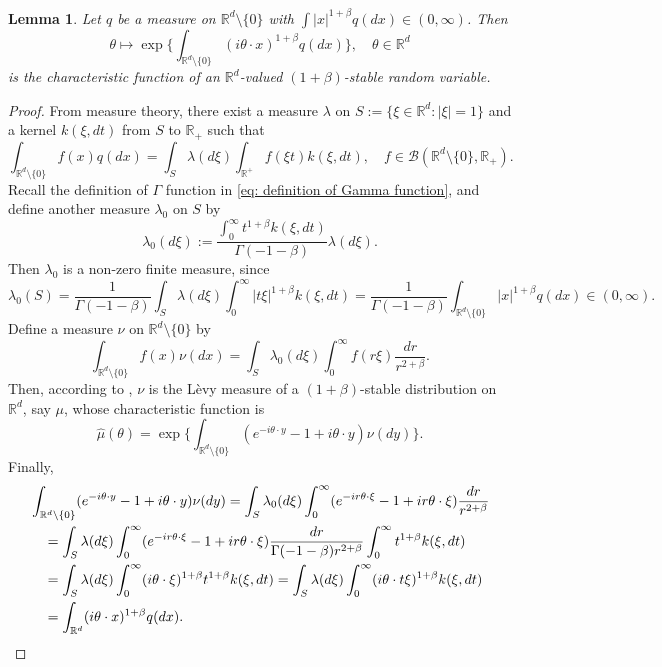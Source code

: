 \documentclass[12pt,a4paper]{amsart}
\theoremstyle{plain}
\newtheorem{lem}[thm]{Lemma}
\theoremstyle{definition}
\numberwithin{equation}{section}
\begin{document}
\begin{lem}
\label{lem: charactreisticfunction}
    Let $q$ be a measure on $\mathbb R^d\setminus\{0\}$ with $\int |x|^{1+\beta} q(dx) \in (0,\infty)$.
    Then $$\theta \mapsto  \exp\Big\{\int_{\mathbb R^d\setminus\{0\}} (i\theta \cdot x)^{1+\beta} q(dx)\Big\},\quad \theta \in \mathbb R^d$$
    is the characteristic function of an $\mathbb R^d$-valued $(1+\beta)$-stable random variable.
\end{lem}
\begin{proof}
    From measure theory, there exist a measure $\lambda$ on $S:= \{\xi\in \mathbb R^d:|\xi| = 1\}$ and a kernel $k(\xi,dt)$ from $S$ to $\mathbb R_+$ such that
\[
    \int_{\mathbb R^d\setminus \{0\}} f(x)q(dx) = \int_S \lambda(d\xi) \int_{\mathbb R^+} f(\xi t)k(\xi,dt),\quad
    f\in \mathcal B(\mathbb R^d\setminus \{0\}, \mathbb R_+).
\]
Recall the definition of $\Gamma$ function in \eqref{eq: definition of Gamma function}, and define another measure $\lambda_0$ on $S$ by
\[
    \lambda_0(d\xi) := \frac{\int_0^\infty t^{1+\beta}k(\xi,dt)}{\Gamma(-1-\beta)} \lambda (d\xi).
\]
    Then $\lambda_0$ is a non-zero finite measure, since
\[
    \lambda_0(S) = \frac{1}{\Gamma(-1-\beta)} \int_S \lambda (d\xi) \int_0^\infty |t\xi|^{1+\beta}k(\xi,dt)
    = \frac{1}{\Gamma(-1-\beta)} \int_{\mathbb R^d\setminus\{0\}} |x|^{1+\beta} q(dx) \in (0,\infty).
\]
    Define a measure $\nu$ on $\mathbb R^d\setminus\{0\}$ by
\[
    \int_{\mathbb R^d\setminus\{0\}}f(x)\nu(dx)= \int_{S} \lambda_0(d\xi) \int_0^\infty f(r\xi) \frac{dr}{r^{2+\beta}} .
\]
    Then, according to \cite[Remark 14.4]{Sato1999Levy}, $\nu$ is the L\`evy measure of a $(1+\beta)$-stable distribution on $\mathbb R^d$, say $\mu$, whose characteristic function is \[\hat \mu(\theta)=\exp\Big\{\int_{\mathbb R^d\setminus\{0\}} (e^{-i\theta \cdot y}-1+i\theta \cdot y) \nu(dy)\Big\}.\]
	Finally,
\begin{equation}\begin{split}
    &\int_{\mathbb R^d\setminus\{0\}} (e^{-i\theta \cdot y}-1+i\theta \cdot y) \nu(dy)
    = \int_S \lambda_0(d\xi) \int_0^\infty (e^{-ir\theta \cdot \xi}-1+ir\theta \cdot \xi) \frac{dr}{r^{2+\beta}}
\\&\quad = \int_S \lambda (d\xi) \int_0^\infty (e^{-ir\theta \cdot \xi}-1+ir\theta \cdot \xi) \frac{dr}{\Gamma(-1-\beta)r^{2+\beta}}\int_0^\infty t^{1+\beta} k(\xi,dt)
\\&\quad = \int_S \lambda (d\xi) \int_0^\infty (i\theta\cdot \xi)^{1+\beta} t^{1+\beta} k(\xi,dt)
= \int_S \lambda(d\xi) \int_0^\infty (i\theta \cdot t\xi)^{1+\beta} k(\xi,dt)
\\&\quad = \int_{\mathbb R^d} (i\theta \cdot x)^{1+\beta} q(dx).
\qedhere
\end{split}\end{equation}
\end{proof}
\end{document}
